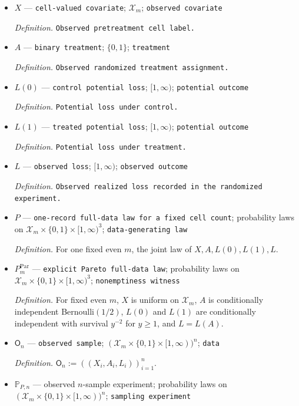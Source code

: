 \documentclass{article}
\begin{document}
\begin{itemize}
  \item \(X\) --- \texttt{cell-\allowbreak{}valued covariate}; \(\mathcal X_m\); \texttt{observed covariate}
  \par\smallskip\noindent\emph{Definition.} \texttt{Observed pretreatment cell label.}
  \item \(A\) --- \texttt{binary treatment}; \(\{0,1\}\); \texttt{treatment}
  \par\smallskip\noindent\emph{Definition.} \texttt{Observed randomized treatment assignment.}
  \item \(L(0)\) --- \texttt{control potential loss}; \([1,\infty)\); \texttt{potential outcome}
  \par\smallskip\noindent\emph{Definition.} \texttt{Potential loss under control.}
  \item \(L(1)\) --- \texttt{treated potential loss}; \([1,\infty)\); \texttt{potential outcome}
  \par\smallskip\noindent\emph{Definition.} \texttt{Potential loss under treatment.}
  \item \(L\) --- \texttt{observed loss}; \([1,\infty)\); \texttt{observed outcome}
  \par\smallskip\noindent\emph{Definition.} \texttt{Observed realized loss recorded in the randomized experiment.}
  \item \(P\) --- \texttt{one-\allowbreak{}record full-\allowbreak{}data law for a fixed cell count}; probability laws on \(\mathcal X_m\times\{0,1\}\times[1,\infty)^3\); \texttt{data-\allowbreak{}generating law}
  \par\smallskip\noindent\emph{Definition.} For one fixed even \(m\), the joint law of \(X,A,L(0),L(1),L\).
  \item \(P_m^{\mathrm{Par}}\) --- \texttt{explicit Pareto full-\allowbreak{}data law}; probability laws on \(\mathcal X_m\times\{0,1\}\times[1,\infty)^3\); \texttt{nonemptiness witness}
  \par\smallskip\noindent\emph{Definition.} For fixed even \(m\), \(X\) is uniform on \(\mathcal X_m\), \(A\) is conditionally independent Bernoulli\((1/2)\), \(L(0)\) and \(L(1)\) are conditionally independent with survival \(y^{-2}\) for \(y\ge1\), and \(L=L(A)\).
  \item \(\mathsf O_n\) --- \texttt{observed sample}; \((\mathcal X_m\times\{0,1\}\times[1,\infty))^n\); \texttt{data}
  \par\smallskip\noindent\emph{Definition.} \(\mathsf O_n:=((X_i,A_i,L_i))_{i=1}^n\).
  \item \(\mathbb P_{P,n}\) --- observed \(n\)-sample experiment; probability laws on \((\mathcal X_m\times\{0,1\}\times[1,\infty))^n\); \texttt{sampling experiment}

\end{itemize}
\end{document}

